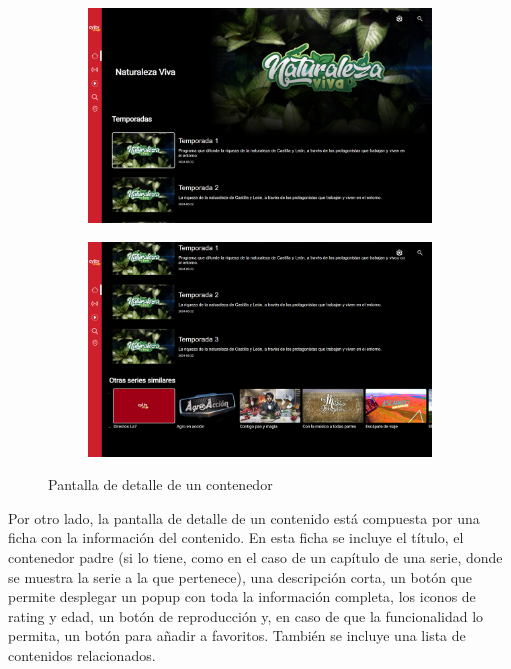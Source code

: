 \begin{figure}[H]
    \begin{subfigure}[c]{0.5\textwidth}
        \includegraphics[width=\textwidth]{imaxes/OTT/pantalla_detalle_contenedor1.png}
        \label{fig:Widget_banner_contenedor}
    \end{subfigure}
    \hspace{0.1\textwidth}
    \begin{subfigure}[c]{0.5\textwidth}
        \includegraphics[width=\textwidth]{imaxes/OTT/pantalla_detalle_contenedor2.png}
        \label{fig:Widget_mosaico}
    \end{subfigure}
    \caption{Pantalla de detalle de un contenedor}
\end{figure}

Por otro lado, la pantalla de detalle de un contenido está compuesta por una ficha con la información del contenido. En esta ficha se incluye el título, 
el contenedor padre (si lo tiene, como en el caso de un capítulo de una serie, donde se muestra la serie a la que pertenece), una descripción corta, un 
botón que permite desplegar un popup con toda la información completa, los iconos de rating y edad, un botón de reproducción y, en caso de que la 
funcionalidad lo permita, un botón para añadir a favoritos. También se incluye una lista de contenidos relacionados.


